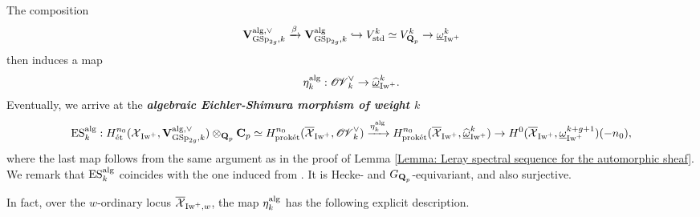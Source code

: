 The composition
$$\V_{\GSp_{2g}, k}^{\alg, \vee}\xrightarrow[]{\beta}\V_{\GSp_{2g}, k}^{\alg}\hookrightarrow V_{\mathrm{std}}^k\simeq V_{\Q_p}^{k}\rightarrow  \underline{\omega}_{\Iw^+}^k$$ then induces a map \[
    \eta_{k}^{\alg}: \sheafOV_k^{\vee} \rightarrow \widehat{\underline{\omega}}_{\Iw^+}^k.
\] Eventually, we arrive at the \textbf{\textit{algebraic Eichler-Shimura morphism of weight $k$}} \begin{align*}
    \ES_k^{\alg}: H_{\et}^{n_0}(\calX_{\Iw^+}, \V_{\GSp_{2g}, k}^{\alg, \vee}) \otimes_{\Q_p}\C_p \simeq H_{\proket}^{n_0}(\overline{\calX}_{\Iw^+}, \sheafOV_k^{\vee}) \xrightarrow{\eta_k^{\alg}} H_{\proket}^{n_0}(\overline{\calX}_{\Iw^+}, \widehat{\underline{\omega}}_{\Iw^+}^k) \rightarrow H^0(\overline{\calX}_{\Iw^+}, \underline{\omega}_{\Iw^+}^{k+g+1})(-n_0),
\end{align*} where the last map follows from the same argument as in the proof of Lemma \ref{Lemma: Leray spectral sequence for the automorphic sheaf}. We remark that $\ES_k^{\alg}$ coincides with the one induced from \cite[Theorem VI. 6.2]{Faltings-Chai}. It is Hecke- and $G_{\Q_p}$-equivariant, and also surjective. 

In fact, over the $w$-ordinary locus $\overline{\calX}_{\Iw^+, w}$, the map $\eta_{k}^{\alg}$ has the following explicit description. 

